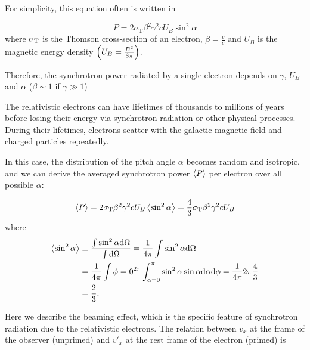 For simplicity, this equation often is written in

\begin{equation}\label{eq:essential_radio5n37}
    P=2 \sigma_{\mathrm{T}} \beta^{2} \gamma^{2} c U_{B} \sin ^{2} \alpha
\end{equation}
where $\sigma_{\mathrm{T}}$ is the Thomson cross-section of an electron, $\beta=\frac{v}{c}$ and $U_B$ is the magnetic energy density $\left(U_B = \frac{B^2}{8\pi}\right)$.

Therefore, the synchrotron power radiated by a single electron depends on $\gamma$, $U_B$ and $\alpha$ ($\beta\sim1$ if $\gamma \gg 1$)

The relativistic electrons can have lifetimes of thousands to millions of years before losing their energy via synchrotron radiation or other physical processes.
During their lifetimes, electrons scatter with the galactic magnetic field and charged particles repeatedly.

In this case, the distribution of the pitch angle $\alpha$ becomes random and isotropic, and we can derive the averaged synchrotron power $\left\langle P\right\rangle$ per electron over all possible $\alpha$:

\begin{equation}\label{eq:essential_radio5n38}
    \left\langle P\right\rangle = 2 \sigma_{\mathrm{T}} \beta^2 \gamma^2 c U_B\left\langle\sin^2 \alpha\right\rangle = \frac{4}{3}\sigma_{\mathrm{T}} \beta^2 \gamma^2 c U_B
\end{equation}
where
\begin{equation}\label{eq:essential_radio5n39}
    \begin{aligned}
    \left\langle\sin^2 \alpha\right\rangle & \equiv \frac{\int \sin^2 \alpha \mathrm{d} \Omega}{\int \mathrm{d} \Omega}=\frac{1}{4\pi} \int \sin^2 \alpha \mathrm{d} \Omega \\
                        &=\frac{1}{4\pi} \int {\phi=0}^{2\pi} \int_{\alpha=0}^{\pi} \sin^2 \alpha \sin \alpha \mathrm{d} \alpha \mathrm{d} \phi=\frac{1}{4\pi} 2 \pi \frac{4}{3} \\
                        &=\frac{2}{3}.
    \end{aligned}
\end{equation}

Here we describe the beaming effect, which is the specific feature of synchrotron radiation due to the relativistic electrons.
The relation between $v_x$ at the frame of the observer (unprimed) and $v'_x$  at the rest frame of the electron (primed) is

